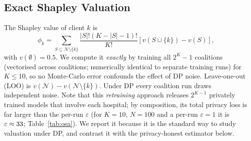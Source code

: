\documentclass[journal]{IEEEtran}
\begin{document}
\subsection{Exact Shapley Valuation}
The Shapley value of client $k$ is
\begin{equation}
\phi_k = \sum_{S \subseteq \mathcal{N} \setminus \{k\}} \frac{|S|!(K - |S| - 1)!}{K!} \left[ v(S \cup \{k\}) - v(S) \right],
\end{equation}
with $v(\emptyset)=0.5$. We compute it \emph{exactly} by training all $2^K-1$ coalitions (vectorised across coalitions; numerically identical to separate training runs) for $K \le 10$, so no Monte-Carlo error confounds the effect of DP noise. Leave-one-out (LOO) is $v(\mathcal{N}) - v(\mathcal{N}\setminus\{k\})$. Under DP every coalition run draws independent noise. Note that this \emph{retraining} approach releases $2^{K-1}$ privately trained models that involve each hospital; by composition, its total privacy loss is far larger than the per-run $\varepsilon$ (for $K=10$, $N=100$ and a per-run $\varepsilon=1$ it is $\varepsilon\approx33$; Table~\ref{tab:osa}). We report it because it is the standard way to study valuation under DP, and contrast it with the privacy-honest estimator below.
\end{document}
